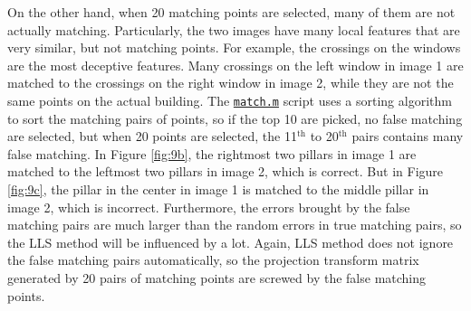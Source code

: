 On the other hand, when 20 matching points are selected, many of them are not actually matching.
Particularly, the two images have many local features that are very similar, but not matching points.
For example, the crossings on the windows are the most deceptive features.
Many crossings on the left window in image 1 are matched to the crossings on the right window in image 2, while they are not the same points on the actual building.
The \href{./hw2/problem3/match.m}{\texttt{match.m}} script uses a sorting algorithm to sort the matching pairs of points, so if the top 10 are picked, no false matching are selected, but when 20 points are selected, the 11\(^\text{th}\) to 20\(^\text{th}\) pairs contains many false matching.
In Figure \ref{fig:9b}, the rightmost two pillars in image 1 are matched to the leftmost two pillars in image 2, which is correct.
But in Figure \ref{fig:9c}, the pillar in the center in image 1 is matched to the middle pillar in image 2, which is incorrect.
Furthermore, the errors brought by the false matching pairs are much larger than the random errors in true matching pairs, so the LLS method will be influenced by a lot.
Again, LLS method does not ignore the false matching pairs automatically, so the projection transform matrix generated by 20 pairs of matching points are screwed by the false matching points.

